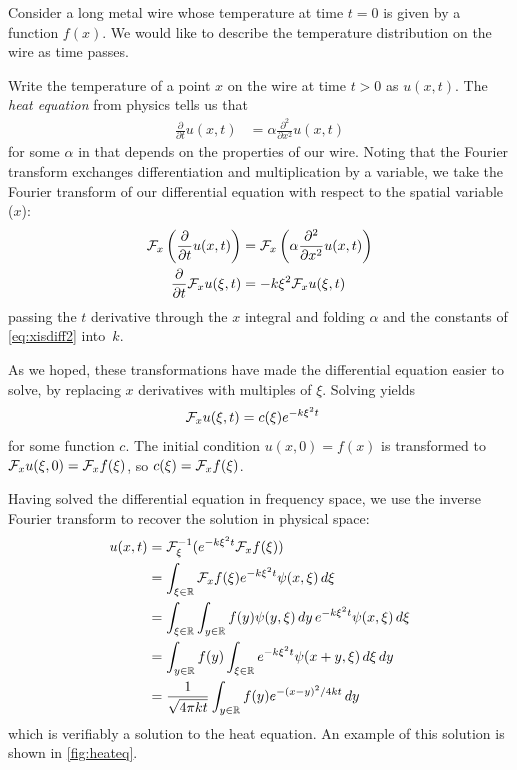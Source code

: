       \begin{example}
        \label{ex:heateq}
        Consider a long metal wire whose temperature at time $t=0$ is given by a function $f(x)$.
        We would like to describe the temperature distribution on the wire as time passes.

        Write the temperature of a point $x$ on the wire at time $t>0$ as $u(x,t)$.
        The \emph{heat equation} from physics tells us that
        \begin{align*}
          \frac{\partial}{\partial t}u(x,t) &= \alpha\frac{\partial^2}{\partial x^2}u(x,t)
        \end{align*}
        for some $\alpha$ in \R that depends on the properties of our wire. 
        Noting that the Fourier transform exchanges differentiation and multiplication by a variable, we take the Fourier transform of our differential equation with respect to the spatial variable ($x$):
        \begin{align*}
          \mathcal{F}_x\left(\frac{\partial}{\partial t}u(x,t)\right) &= \mathcal{F}_x\left(\alpha\frac{\partial^2}{\partial x^2}u(x,t)\right)\\
          \frac{\partial}{\partial t}\mathcal{F}_xu(\xi,t) &= -k\xi^2\mathcal{F}_xu(\xi,t)
        \end{align*}
        passing the $t$ derivative through the $x$ integral and folding $\alpha$ and the constants of \cref{eq:xisdiff2} into~$k$.

        As we hoped, these transformations have made the differential equation easier to solve, by replacing $x$ derivatives with multiples of $\xi$.
        Solving yields
        \begin{align*}
          \mathcal{F}_xu(\xi,t) &= c(\xi)e^{-k\xi^2t}
        \end{align*}
        for some function $c$.
        The initial condition $u(x,0)=f(x)$ is transformed to $\mathcal{F}_xu(\xi,0) = \mathcal{F}_x f(\xi)$, so $c(\xi)=\mathcal{F}_x f(\xi)$.

        Having solved the differential equation in frequency space, we use the inverse Fourier transform to recover the solution in physical space:
        \begin{align}
          \notag u(x,t) &= \mathcal{F}^{-1}_\xi(e^{-k\xi^2t}\mathcal{F}_x f(\xi))\\
          \notag &= \int_{\xi\in\mathbb{R}} \mathcal{F}_x f(\xi)e^{-k\xi^2t}\psi(x,\xi)\,d\xi\\
          \notag &= \int_{\xi\in\mathbb{R}} \int_{y\in\mathbb{R}} f(y)\psi(y,\xi)\,dy\,e^{-k\xi^2t}\psi(x,\xi)\,d\xi\\
          \notag &= \int_{y\in\mathbb{R}} f(y) \int_{\xi\in\mathbb{R}} e^{-k\xi^2t}\psi(x+y,\xi)\,d\xi\,dy\\
          \label{eq:heatsoln} &= \frac{1}{\sqrt{4\pi kt}}\int_{y\in\mathbb{R}} f(y)e^{-(x-y)^2/4kt}\,dy
        \end{align}
        which is verifiably a solution to the heat equation.
        An example of this solution is shown in \cref{fig:heateq}.


\end{example}
